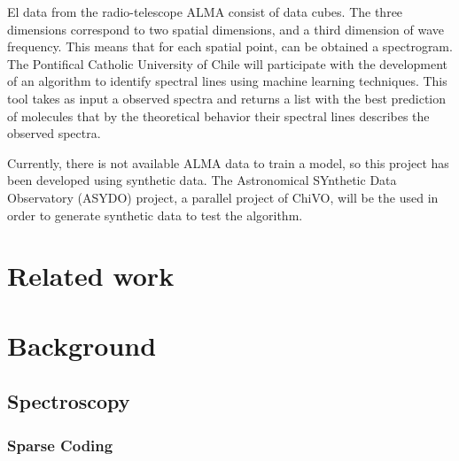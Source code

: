 \documentclass[twocolumn, draft]{emulateapj}
\begin{document}
El data from the radio-telescope ALMA consist of data cubes. The three dimensions correspond to two spatial dimensions, and
a third dimension of wave frequency. This means that for each spatial point, can be obtained a spectrogram.
The Pontifical Catholic University of Chile will participate with the development of an algorithm to identify spectral lines
using machine learning techniques. This tool takes as input a observed spectra and returns a list with the best prediction of
molecules that by the theoretical behavior their spectral lines describes the observed spectra.

Currently, there is not available ALMA data to train a model, so this project has been developed using synthetic data.
The Astronomical SYnthetic Data Observatory (ASYDO) project, a parallel project of ChiVO, will be the used in order to generate synthetic data to test the algorithm.

\section{Related work}
\label{sec:related}



\section{Background}
\label{sec:background}
\subsection{Spectroscopy}


\subsubsection{Sparse Coding}

\end{document}
